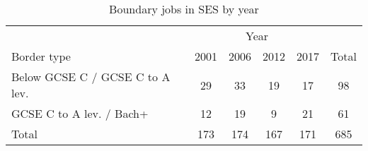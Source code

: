 \begin{table}
	\caption{Boundary jobs in SES by year}
	\label{tab:sesBorderJobs}
	\centering
	\begin{tabular}{lccccc}
	
\toprule
& \multicolumn{4}{c}{Year}\\
Border type & 2001 & 2006 & 2012 & 2017 & Total \\
\midrule
Below GCSE C / GCSE C to A lev.&29&33&19&17&98 \\
GCSE C to A lev. / Bach+&12&19&9&21&61 \\
\vspace{0cm}
\vspace{0cm}
\midrule
\midrule
Total&173&174&167&171&685 \\
\bottomrule
\end{tabular}
\end{table}
